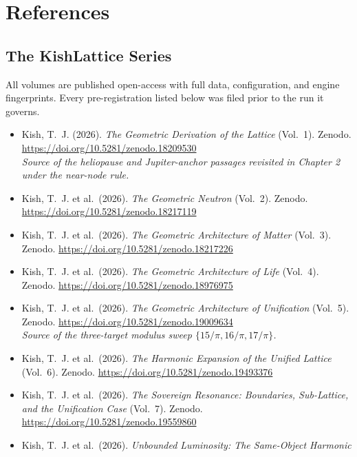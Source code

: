 \documentclass[11pt, letterpaper, openany]{book}
\begin{document}
\chapter*{References}

\section*{The KishLattice Series}

All volumes are published open-access with full data, configuration, and engine
fingerprints. Every pre-registration listed below was filed prior to the run it governs.

\begin{itemize}
    \item Kish, T.~J. (2026). \textit{The Geometric Derivation of the Lattice} (Vol.~1).
          Zenodo. \url{https://doi.org/10.5281/zenodo.18209530}
          \\ \textit{Source of the heliopause and Jupiter-anchor passages revisited in
          Chapter 2 under the near-node rule.}
    \item Kish, T.~J. et al.\ (2026). \textit{The Geometric Neutron} (Vol.~2).
          Zenodo. \url{https://doi.org/10.5281/zenodo.18217119}
    \item Kish, T.~J. et al.\ (2026). \textit{The Geometric Architecture of Matter} (Vol.~3).
          Zenodo. \url{https://doi.org/10.5281/zenodo.18217226}
    \item Kish, T.~J. et al.\ (2026). \textit{The Geometric Architecture of Life} (Vol.~4).
          Zenodo. \url{https://doi.org/10.5281/zenodo.18976975}
    \item Kish, T.~J. et al.\ (2026). \textit{The Geometric Architecture of Unification}
          (Vol.~5). Zenodo. \url{https://doi.org/10.5281/zenodo.19009634}
          \\ \textit{Source of the three-target modulus sweep $\{15/\pi, 16/\pi, 17/\pi\}$.}
    \item Kish, T.~J. et al.\ (2026). \textit{The Harmonic Expansion of the Unified Lattice}
          (Vol.~6). Zenodo. \url{https://doi.org/10.5281/zenodo.19493376}
    \item Kish, T.~J. et al.\ (2026). \textit{The Sovereign Resonance: Boundaries,
          Sub-Lattice, and the Unification Case} (Vol.~7).
          Zenodo. \url{https://doi.org/10.5281/zenodo.19559860}
    \item Kish, T.~J. et al.\ (2026). \textit{Unbounded Luminosity: The Same-Object Harmonic
}
\end{itemize}
\end{document}
